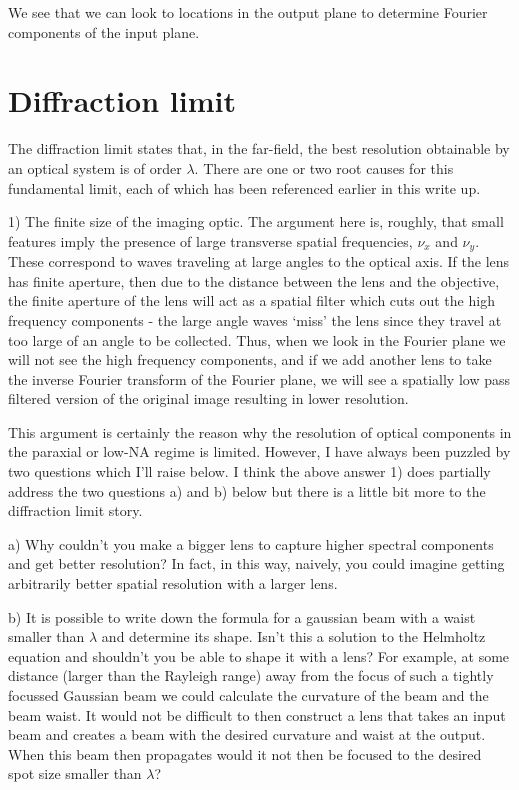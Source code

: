 \documentclass[12pt]{article}
\begin{document}
We see that we can look to locations in the output plane to determine Fourier components of the input plane.

\section{Diffraction limit}

The diffraction limit states that, in the far-field, the best resolution obtainable by an optical system is of order $\lambda$. There are one or two root causes for this fundamental limit, each of which has been referenced earlier in this write up. 

1) The finite size of the imaging optic. The argument here is, roughly, that small features imply the presence of large transverse spatial frequencies, $\nu_x$ and $\nu_y$. 
These correspond to waves traveling at large angles to the optical axis. 
If the lens has finite aperture, then due to the distance between the lens and the objective, the finite aperture of the lens will act as a spatial filter which cuts out the high frequency components - the large angle waves `miss' the lens since they travel at too large of an angle to be collected. Thus, when we look in the Fourier plane we will not see the high frequency components, and if we add another lens to take the inverse Fourier transform of the Fourier plane, we will see a spatially low pass filtered version of the original image resulting in lower resolution.

This argument is certainly the reason why the resolution of optical components in the paraxial or low-NA regime is limited. However, I have always been puzzled by two questions which I'll raise below. I think the above answer 1) does partially address the two questions a) and b) below but there is a little bit more to the diffraction limit story. 

a) Why couldn't you make a bigger lens to capture higher spectral components and get better resolution? In fact, in this way, naively, you could imagine getting arbitrarily better spatial resolution with a larger lens.

b) It is possible to write down the formula for a gaussian beam with a waist smaller than $\lambda$ and determine its shape. Isn't this a solution to the Helmholtz equation and shouldn't you be able to shape it with a lens? For example, at some distance (larger than the Rayleigh range) away from the focus of such a tightly focussed Gaussian beam we could calculate the curvature of the beam and the beam waist. It would not be difficult to then construct a lens that takes an input beam and creates a beam with the desired curvature and waist at the output. When this beam then propagates would it not then be focused to the desired spot size smaller than $\lambda$?
\end{document}
